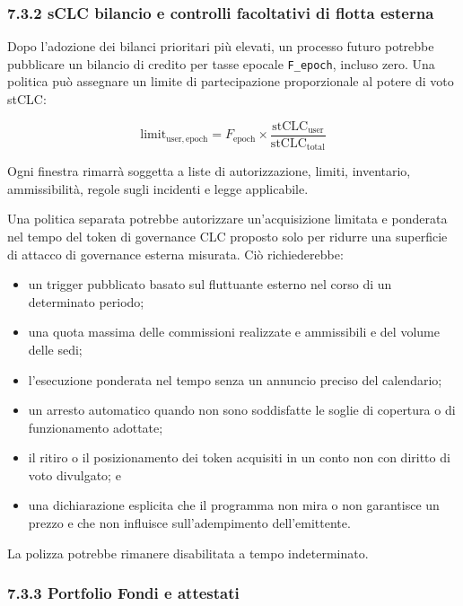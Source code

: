 \documentclass[11pt]{article}
\begin{document}
\subsubsection*{7.3.2 sCLC bilancio e controlli facoltativi di flotta esterna}

Dopo l'adozione dei bilanci prioritari più elevati, un processo futuro potrebbe pubblicare un bilancio di credito per tasse epocale \texttt{F\_epoch}, incluso zero. Una politica può assegnare un limite di partecipazione proporzionale al potere di voto stCLC:

\[
\mathrm{limit}_{\mathrm{user,epoch}} = F_{\mathrm{epoch}} \times \frac{\mathrm{stCLC}_{\mathrm{user}}}{\mathrm{stCLC}_{\mathrm{total}}}
\]

Ogni finestra rimarrà soggetta a liste di autorizzazione, limiti, inventario, ammissibilità, regole sugli incidenti e legge applicabile.

Una politica separata potrebbe autorizzare un'acquisizione limitata e ponderata nel tempo del token di governance CLC proposto solo per ridurre una superficie di attacco di governance esterna misurata. Ciò richiederebbe:

\begin{itemize}[leftmargin=*]
\item un trigger pubblicato basato sul fluttuante esterno nel corso di un determinato periodo;
\item una quota massima delle commissioni realizzate e ammissibili e del volume delle sedi;
\item l'esecuzione ponderata nel tempo senza un annuncio preciso del calendario;
\item un arresto automatico quando non sono soddisfatte le soglie di copertura o di funzionamento adottate;
\item il ritiro o il posizionamento dei token acquisiti in un conto non con diritto di voto divulgato; e
\item una dichiarazione esplicita che il programma non mira o non garantisce un prezzo e che non influisce sull'adempimento dell'emittente.
\end{itemize}
La polizza potrebbe rimanere disabilitata a tempo indeterminato.

\subsubsection*{7.3.3 Portfolio Fondi e attestati}
\end{document}
